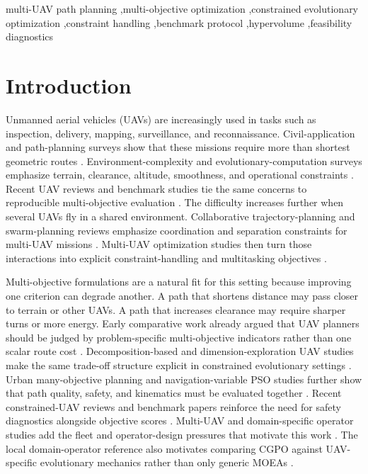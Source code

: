 \documentclass[a4paper,fleqn]{cas-dc}
\begin{document}
\begin{keywords}
multi-UAV path planning \sep multi-objective optimization \sep constrained evolutionary optimization \sep constraint handling \sep benchmark protocol \sep hypervolume \sep feasibility diagnostics
\end{keywords}

\maketitle

\section{Introduction}
\label{sec:introduction}

Unmanned aerial vehicles (UAVs) are increasingly used in tasks such as inspection, delivery, mapping, surveillance, and reconnaissance. Civil-application and path-planning surveys show that these missions require more than shortest geometric routes \cite{otto2018uav_civil,aggarwal2020uav_techniques}. Environment-complexity and evolutionary-computation surveys emphasize terrain, clearance, altitude, smoothness, and operational constraints \cite{jones2023uav_survey,jiang2024ec_uav_survey}. Recent UAV reviews and benchmark studies tie the same concerns to reproducible multi-objective evaluation \cite{meng2025uav_advances,darlan2025benchmark}. The difficulty increases further when several UAVs fly in a shared environment. Collaborative trajectory-planning and swarm-planning reviews emphasize coordination and separation constraints for multi-UAV missions \cite{wang2024collaborative_review,li2026swarm_review}. Multi-UAV optimization studies then turn those interactions into explicit constraint-handling and multitasking objectives \cite{zhang2024twofold_uav,meng2025emmop}.

Multi-objective formulations are a natural fit for this setting because improving one criterion can degrade another. A path that shortens distance may pass closer to terrain or other UAVs. A path that increases clearance may require sharper turns or more energy. Early comparative work already argued that UAV planners should be judged by problem-specific multi-objective indicators rather than one scalar route cost \cite{besada2013uav_comparison}. Decomposition-based and dimension-exploration UAV studies make the same trade-off structure explicit in constrained evolutionary settings \cite{peng2022decomp_uav,xu2024dimension_uav}. Urban many-objective planning and navigation-variable PSO studies further show that path quality, safety, and kinematics must be evaluated together \cite{hohmann2023urban_uav,duong2025nmopso_uav}. Recent constrained-UAV reviews and benchmark papers reinforce the need for safety diagnostics alongside objective scores \cite{huang2024uav_cmoea_review,darlan2025benchmark}. Multi-UAV and domain-specific operator studies add the fleet and operator-design pressures that motivate this work \cite{meng2025emmop,zhou2024tskac}. The local domain-operator reference also motivates comparing CGPO against UAV-specific evolutionary mechanics rather than only generic MOEAs \cite{darlan2026domainops}.
\end{document}
